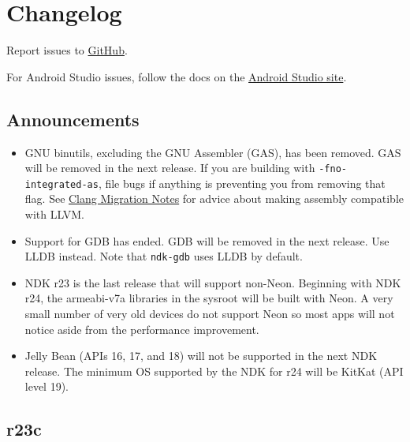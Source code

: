\hypertarget{changelog}{%
\section{Changelog}\label{changelog}}

Report issues to \href{https://github.com/android/ndk/issues}{GitHub}.

For Android Studio issues, follow the docs on the
\href{http://tools.android.com/filing-bugs}{Android Studio site}.

\hypertarget{announcements}{%
\subsection{Announcements}\label{announcements}}

\begin{itemize}
\item
  GNU binutils, excluding the GNU Assembler (GAS), has been removed. GAS
  will be removed in the next release. If you are building with
  \texttt{-fno-integrated-as}, file bugs if anything is preventing you
  from removing that flag. See \href{ClangMigration.md}{Clang Migration
  Notes} for advice about making assembly compatible with LLVM.
\item
  Support for GDB has ended. GDB will be removed in the next release.
  Use LLDB instead. Note that \texttt{ndk-gdb} uses LLDB by default.
\item
  NDK r23 is the last release that will support non-Neon. Beginning with
  NDK r24, the armeabi-v7a libraries in the sysroot will be built with
  Neon. A very small number of very old devices do not support Neon so
  most apps will not notice aside from the performance improvement.
\item
  Jelly Bean (APIs 16, 17, and 18) will not be supported in the next NDK
  release. The minimum OS supported by the NDK for r24 will be KitKat
  (API level 19).
\end{itemize}

\hypertarget{r23c}{%
\subsection{r23c}\label{r23c}}

